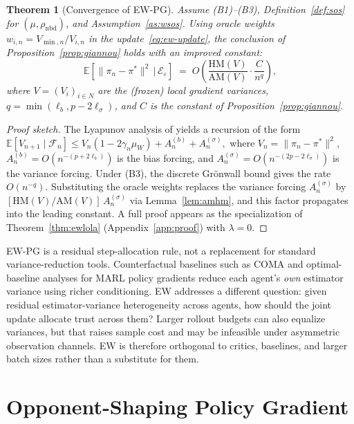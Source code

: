 \documentclass{article}
\theoremstyle{plain}
\newtheorem{theorem}{Theorem}[section]
\theoremstyle{definition}
\theoremstyle{remark}
\newcommand{\HM}{\mathrm{HM}}
\newcommand{\AM}{\mathrm{AM}}
\newcommand{\E}{\mathbb{E}}
\begin{document}
\begin{theorem}[Convergence of EW-PG]\label{thm:ew-conv}
Assume \textup{(B1)--(B3)}, Definition~\ref{def:sos} for $(\mu,\rho_{\mathrm{nbd}})$, and Assumption~\ref{as:wsos}. Using oracle weights $w_{i,n}=V_{\min,n}/V_{i,n}$ in the update~\eqref{eq:ew-update}, the conclusion of Proposition~\ref{prop:giannou} holds with an improved constant:
\begin{equation}\label{eq:ew-conv}
\E\!\left[\|\pi_n-\pi^\ast\|^2 \,\big|\, \mathcal{E}_\varepsilon\right] \;=\; O\!\left(\frac{\HM(V)}{\AM(V)}\cdot\frac{C}{n^q}\right),
\end{equation}
where $V=(V_i)_{i\in N}$ are the (frozen) local gradient variances, $q=\min(\ell_b,p-2\ell_\sigma)$, and $C$ is the constant of Proposition~\ref{prop:giannou}.
\end{theorem}

\begin{proof}[Proof sketch]
The Lyapunov analysis of \citet{giannou2022convergence} yields a recursion of the form
\(
\E[V_{n+1}\mid\mathcal{F}_n]\le V_n(1-2\gamma_n\mu_W) + A_n^{(b)} + A_n^{(\sigma)},
\)
where $V_n=\|\pi_n-\pi^\ast\|^2$, $A_n^{(b)}=O(n^{-(p+2\ell_b)})$ is the bias forcing, and $A_n^{(\sigma)}=O(n^{-(2p-2\ell_\sigma)})$ is the variance forcing. Under (B3), the discrete Gr\"onwall bound gives the rate $O(n^{-q})$. Substituting the oracle weights replaces the variance forcing $A_n^{(\sigma)}$ by $[\HM(V)/\AM(V)]\,A_n^{(\sigma)}$ via Lemma~\ref{lem:amhm}, and this factor propagates into the leading constant. A full proof appears as the specialization of Theorem~\ref{thm:ewlola} (Appendix~\ref{app:proof}) with $\lambda=0$.
\end{proof}

EW-PG is a residual step-allocation rule, not a replacement for standard variance-reduction tools. Counterfactual baselines such as COMA \citep{foerster2018coma} and optimal-baseline analyses for MARL policy gradients \citep{kuba2022variance} reduce each agent's \emph{own} estimator variance using richer conditioning. EW addresses a different question: given residual estimator-variance heterogeneity across agents, how should the joint update allocate trust across them? Larger rollout budgets can also equalize variances, but that raises sample cost and may be infeasible under asymmetric observation channels. EW is therefore orthogonal to critics, baselines, and larger batch sizes rather than a substitute for them.

\section{Opponent-Shaping Policy Gradient}
\end{document}
